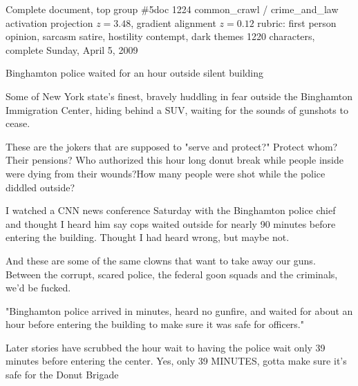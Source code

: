 \begin{docbox}{Complete document, top group \#5}{doc 1224 \textbullet{} common\_crawl / crime\_and\_law \textbullet{} activation projection $z=3.48$, gradient alignment $z=0.12$ \textbullet{} rubric: first person opinion, sarcasm satire, hostility contempt, dark themes \textbullet{} 1220 characters, complete}
Sunday, April 5, 2009\par Binghamton police waited for an hour outside silent building\par Some of New York state's finest, bravely huddling in fear outside the Binghamton Immigration Center, hiding behind a SUV, waiting for the sounds of gunshots to cease.\par These are the jokers that are supposed to "serve and protect?" Protect whom? Their pensions? Who authorized this hour long donut break while people inside were dying from their wounds?\newline How many people were shot while the police diddled outside?\par I watched a CNN news conference Saturday with the Binghamton police chief and thought I heard him say cops waited outside for nearly 90 minutes before entering the building. Thought I had heard wrong, but maybe not.\par And these are some of the same clowns that want to take away our guns. Between the corrupt, scared police, the federal goon squads and the criminals, we'd be fucked.\par "Binghamton police arrived in minutes, heard no gunfire, and waited for about an hour before entering the building to make sure it was safe for officers."\par Later stories have scrubbed the hour wait to having the police wait only 39 minutes before entering the center. Yes, only 39 MINUTES, gotta make sure it's safe for the Donut Brigade
\end{docbox}

